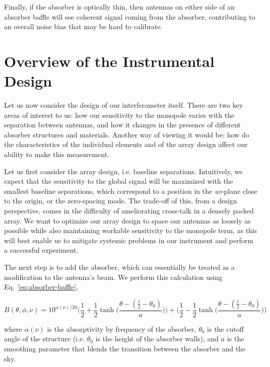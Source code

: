 Finally, if the absorber is optically thin, then antennas on either side of an 
absorber baffle will see coherent signal coming from the absorber, contributing 
to an overall noise bias that may be hard to calibrate.

\section{Overview of the Instrumental Design}

Let us now consider the design of our interferometer itself. There are two key 
areas of interest to us: how our sensitivity to the monopole varies with the 
separation between antennas, and how it changes in the presence of different 
absorber structures and materials. Another way of viewing it would be: how do 
the characteristics of the individual elements and of the array design affect 
our ability to make this measurement.

Let us first consider the array design, i.e. baseline separations. Intuitively, 
we expect that the sensitivity to the global signal will be maximized with the 
smallest baseline separations, which correspond to a position in the 
\emph{uv}-plane close to the origin, or the zero-spacing mode.  The trade-off 
of this, from a design perspective, comes in the difficulty of ameliorating 
cross-talk in a densely packed array. We want to optimize our array design to 
space our antennas as loosely as possible while also maintaining workable 
sensitivity to the monopole term, as this will best enable us to mitigate 
systemic problems in our instrument and perform a successful experiment.

The next step is to add the absorber, which can essentially be treated as a 
modification to the antenna's beam. We perform this calculation using 
Eq.~\eqref{eq:absorber-baffle},

\begin{equation}
    \label{eq:absorber-baffle}
    B(\theta, \phi, \nu) = 10^{\alpha(\nu)/20} \Big(\frac{1}{2} + \frac{1}{2} 
    \tanh\Big(\frac{\theta - (\frac{1}{2} - \theta_{0})}{a}\Big)\Big) +
    \Big(\frac{1}{2} - \frac{1}{2} \tanh\Big(\frac{\theta - (\frac{1}{2} - 
    \theta_{0})}{a}\Big)\Big)
\end{equation}

\noindent where $\alpha(\nu)$ is the absorptivity by frequency of the absorber, 
$\theta_0$ is the cutoff angle of the structure (i.e. $\theta_0$ is the height 
of the absorber walls), and $a$ is the smoothing parameter that blends the 
transition between the absorber and the sky.

